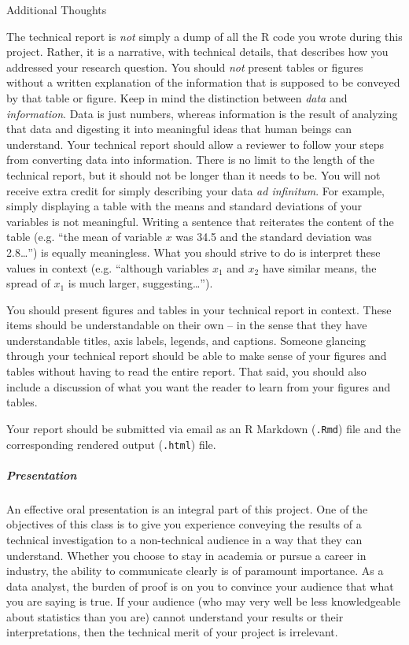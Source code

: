 \documentclass[]{article}
\let\oldsubparagraph\subparagraph
\renewcommand{\subparagraph}[1]{\oldsubparagraph{#1}\mbox{}}
\begin{document}
Additional Thoughts

The technical report is \emph{not} simply a dump of all the R code you
wrote during this project. Rather, it is a narrative, with technical
details, that describes how you addressed your research question. You
should \emph{not} present tables or figures without a written
explanation of the information that is supposed to be conveyed by that
table or figure. Keep in mind the distinction between \emph{data} and
\emph{information}. Data is just numbers, whereas information is the
result of analyzing that data and digesting it into meaningful ideas
that human beings can understand. Your technical report should allow a
reviewer to follow your steps from converting data into information.
There is no limit to the length of the technical report, but it should
not be longer than it needs to be. You will not receive extra credit for
simply describing your data \emph{ad infinitum}. For example, simply
displaying a table with the means and standard deviations of your
variables is not meaningful. Writing a sentence that reiterates the
content of the table (e.g. ``the mean of variable \(x\) was 34.5 and the
standard deviation was 2.8\ldots{}'') is equally meaningless. What you
should strive to do is interpret these values in context (e.g.
``although variables \(x_1\) and \(x_2\) have similar means, the spread
of \(x_1\) is much larger, suggesting\ldots{}'').

You should present figures and tables in your technical report in
context. These items should be understandable on their own -- in the
sense that they have understandable titles, axis labels, legends, and
captions. Someone glancing through your technical report should be able
to make sense of your figures and tables without having to read the
entire report. That said, you should also include a discussion of what
you want the reader to learn from your figures and tables.

Your report should be submitted via email as an R Markdown
(\texttt{.Rmd}) file and the corresponding rendered output
(\texttt{.html}) file.

\subparagraph{Presentation}\label{presentation}

An effective oral presentation is an integral part of this project. One
of the objectives of this class is to give you experience conveying the
results of a technical investigation to a non-technical audience in a
way that they can understand. Whether you choose to stay in academia or
pursue a career in industry, the ability to communicate clearly is of
paramount importance. As a data analyst, the burden of proof is on you
to convince your audience that what you are saying is true. If your
audience (who may very well be less knowledgeable about statistics than
you are) cannot understand your results or their interpretations, then
the technical merit of your project is irrelevant.
\end{document}
